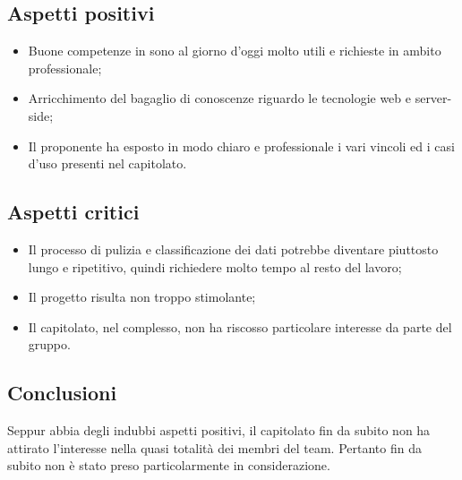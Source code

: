 \subsection{Aspetti positivi}
\begin{itemize}
\item Buone competenze in  sono al giorno d’oggi molto utili e richieste in ambito professionale;
\item Arricchimento del bagaglio di conoscenze riguardo le tecnologie web e server-side;
\item Il proponente ha esposto in modo chiaro e professionale i vari vincoli ed i casi d'uso presenti nel capitolato.
\end{itemize}
\subsection{Aspetti critici}
\begin{itemize}
\item Il processo di pulizia e classificazione dei dati potrebbe diventare piuttosto lungo e ripetitivo, quindi richiedere molto tempo al resto del lavoro;
\item Il progetto risulta non troppo stimolante;
\item Il capitolato, nel complesso, non ha riscosso particolare interesse da parte del gruppo.
\end{itemize}
\subsection{Conclusioni}
Seppur abbia degli indubbi aspetti positivi, il capitolato fin da subito non ha attirato l'interesse nella quasi totalità dei membri del team. Pertanto fin da subito non è stato preso particolarmente in considerazione.
